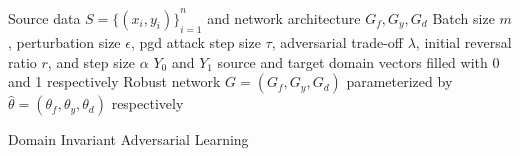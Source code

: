 \begin{algorithm}[tb]

\begin{algorithmic}
  Source data $S={\{(x_i,y_i)\}}_{i=1}^n$ and network architecture $G_f,G_y,G_d$
  Batch size $m$, perturbation size $\epsilon$, pgd attack step size $\tau$, adversarial trade-off $\lambda$, initial reversal ratio $r$, and step size $\alpha$
  $Y_{0}$ and $Y_{1}$  source and target domain vectors filled with 0 and 1 respectively
  Robust network $G=(G_f,G_y,G_d)$ parameterized by $\hat{\theta}=(\theta_f,\theta_y, \theta_d)$ respectively

 \REPEAT 
  
  
   
  \ENDFOR


  
  
  
  \STATE{$\hat{\theta} \leftarrow \hat{\theta} - \alpha\nabla_{\hat{\theta}}(\ell)$}

 
\caption{Domain Invariant Adversarial Learning}
\label{DIAL-algorithm}
\end{algorithmic}
\end{algorithm}

